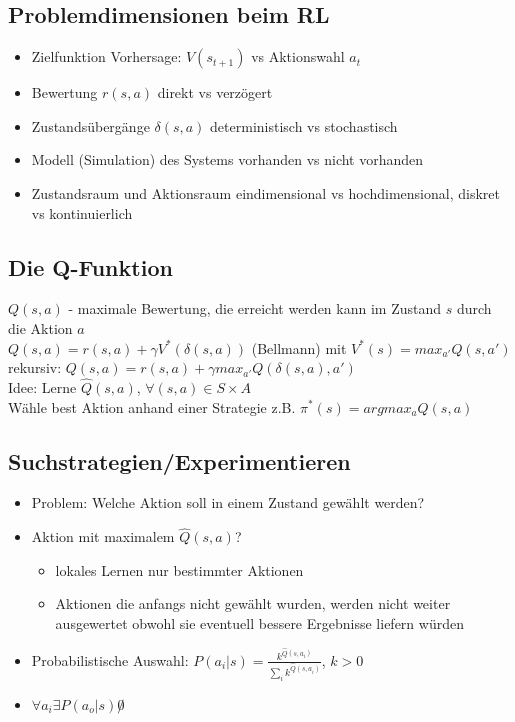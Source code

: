 \documentclass[paper=a4, fontsize=11pt]{scrartcl} %
\numberwithin{equation}{section} %
\numberwithin{figure}{section} %
\numberwithin{table}{section} %
\begin{document}
\subsection{Problemdimensionen beim RL}

\begin{itemize}
\item Zielfunktion Vorhersage: $V(s_{t+1})$ vs Aktionswahl $a_t$
\item Bewertung $r(s,a)$ direkt vs verzögert
\item Zustandsübergänge $\delta(s,a)$ deterministisch vs stochastisch
\item Modell (Simulation) des Systems vorhanden vs nicht vorhanden
\item Zustandsraum und Aktionsraum eindimensional vs hochdimensional, diskret vs kontinuierlich
\end{itemize}

\subsection{Die Q-Funktion}

$Q(s,a)$ - maximale Bewertung, die erreicht werden kann im Zustand $s$ durch die Aktion $a$\\ 
$Q(s,a) = r(s,a) + \gamma V^* (\delta(s,a))$ (Bellmann) mit $V^*(s) = max_{a'}Q(s,a')$\\ 
rekursiv: $Q(s,a) = r(s,a) + \gamma max_{a'} Q(\delta(s,a),a')$\\ 
Idee: Lerne $\hat{Q}(s,a)$, $\forall(s,a) \in S \times A$\\ 
Wähle best Aktion anhand einer Strategie z.B. $\pi^*(s) = argmax_a Q(s,a)$

\subsection{Suchstrategien/Experimentieren}

\begin{itemize}
\item Problem: Welche Aktion soll in einem Zustand gewählt werden?
\item Aktion mit maximalem $\hat{Q}(s,a)$?
\begin{itemize}
\item lokales Lernen nur bestimmter Aktionen
\item Aktionen die anfangs nicht gewählt wurden, werden nicht weiter ausgewertet obwohl sie eventuell bessere Ergebnisse liefern würden
\end{itemize}
\item Probabilistische Auswahl: $P(a_i|s) = \frac{k^{\hat{Q}(s,a_i)}}{\sum\limits_i k^{\hat{Q}(s,a_i)}}$, $k > 0$
\item $\forall a_i \exists P(a_o|s) \not 0$
\end{itemize}
\end{document}
